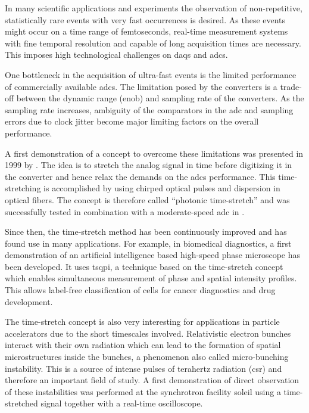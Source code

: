In many scientific applications and experiments the observation of non-repetitive, statistically rare events with very fast occurrences is desired.
As these events might occur on a time range of femtoseconds, real-time measurement systems with fine temporal resolution and capable of long acquisition times are necessary.
This imposes high technological challenges on \glspl{daq} and \glspl{adc}.

One bottleneck in the acquisition of ultra-fast events is the limited performance of commercially available \glspl{adc}. 
The limitation posed by the converters is a trade-off between the dynamic range (\gls{enob}) and sampling rate of the converters.
As the sampling rate increases, ambiguity of the comparators in the \gls{adc} and sampling errors due to clock jitter become major limiting factors on the overall performance. \cite{Mahjoubfar2017}

A first demonstration of a concept to overcome these limitations was presented in 1999 by \cite{ts_adc}. 
The idea is to stretch the analog signal in time before digitizing it in the converter and hence relax the demands on the \glspl{adc} performance. 
This time-stretching is accomplished by using chirped optical pulses and dispersion in optical fibers. %
The concept is therefore called ``photonic time-stretch'' and was successfully tested in combination with a moderate-speed \gls{adc} in \cite{ts_adc}.

Since then, the time-stretch method has been continuously improved and has found use in many applications.
For example, in biomedical diagnostics, a first demonstration of an artificial intelligence based high-speed phase microscope has been developed. 
It uses \gls{tsqpi}, a technique based on the time-stretch concept which enables simultaneous measurement of phase and spatial intensity profiles.
This allows label-free classification of cells for cancer diagnostics and drug development. \cite{Mahjoubfar2017} 

The time-stretch concept is also very interesting for applications in particle accelerators due to the short timescales involved. %
Relativistic electron bunches interact with their own radiation which can lead to the formation of spatial microstructures inside the bunches, a phenomenon also called micro-bunching instability.
This is a source of intense pulses of terahertz radiation (\gls{csr}) and therefore an important field of study. 
A first demonstration of direct observation of these instabilities was performed at the synchrotron facility \gls{soleil} using a time-stretched signal together with a real-time oscilloscope. \cite{Roussel2015}

